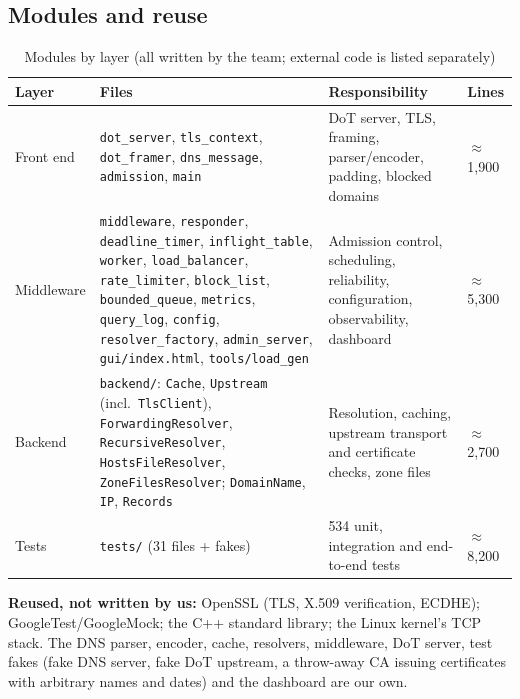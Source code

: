 \documentclass[11pt,a4paper]{article}
\newcommand{\code}[1]{\texttt{#1}}
\begin{document}
\subsection{Modules and reuse}
\begin{table}[H]
\centering\small
\caption{Modules by layer (all written by the team; external code is listed separately)}
\begin{tabularx}{\textwidth}{@{}P{2.6cm}P{5.6cm}LP{1.2cm}@{}}
\toprule
Layer & Files & Responsibility & Lines \\
\midrule
Front end & \code{dot\_server}, \code{tls\_context}, \code{dot\_framer}, \code{dns\_message}, \code{admission}, \code{main} & DoT server, TLS, framing, parser/encoder, padding, blocked domains & $\approx$1{,}900 \\
Middleware & \code{middleware}, \code{responder}, \code{deadline\_timer}, \code{inflight\_table}, \code{worker}, \code{load\_balancer}, \code{rate\_limiter}, \code{block\_list}, \code{bounded\_queue}, \code{metrics}, \code{query\_log}, \code{config}, \code{resolver\_factory}, \code{admin\_server}, \code{gui/index.html}, \code{tools/load\_gen} & Admission control, scheduling, reliability, configuration, observability, dashboard & $\approx$5{,}300 \\
Backend & \code{backend/}: \code{Cache}, \code{Upstream} (incl.\ \code{TlsClient}), \code{ForwardingResolver}, \code{RecursiveResolver}, \code{HostsFileResolver}, \code{ZoneFilesResolver}; \code{DomainName}, \code{IP}, \code{Records} & Resolution, caching, upstream transport and certificate checks, zone files & $\approx$2{,}700 \\
Tests & \code{tests/} (31 files + fakes) & 534 unit, integration and end-to-end tests & $\approx$8{,}200 \\
\bottomrule
\end{tabularx}
\end{table}

\textbf{Reused, not written by us:} OpenSSL (TLS, X.509 verification, ECDHE); GoogleTest/GoogleMock; the C++
standard library; the Linux kernel's TCP stack. The DNS parser, encoder, cache, resolvers, middleware, DoT
server, test fakes (fake DNS server, fake DoT upstream, a throw-away CA issuing certificates with arbitrary
names and dates) and the dashboard are our own.
\end{document}
